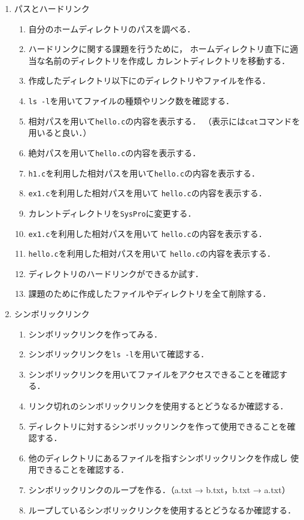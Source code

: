 \begin{enumerate}
\item パスとハードリンク
\begin{enumerate}
\item 自分のホームディレクトリのパスを調べる．
\item ハードリンクに関する課題を行うために，
ホームディレクトリ直下に適当な名前のディレクトリを作成し
カレントディレクトリを移動する．
\item 作成したディレクトリ以下にのディレクトリやファイルを作る．
\item \texttt{ls -l}を用いてファイルの種類やリンク数を確認する．
\item 相対パスを用いて\texttt{hello.c}の内容を表示する．
（表示には\texttt{cat}コマンドを用いると良い．）
\item 絶対パスを用いて\texttt{hello.c}の内容を表示する．
\item \texttt{h1.c}を利用した相対パスを用いて\texttt{hello.c}の内容を表示する．
\item \texttt{ex1.c}を利用した相対パスを用いて
\texttt{hello.c}の内容を表示する．
\item カレントディレクトリを\texttt{SysPro}に変更する．
\item \texttt{ex1.c}を利用した相対パスを用いて
\texttt{hello.c}の内容を表示する．
\item \texttt{hello.c}を利用した相対パスを用いて
\texttt{hello.c}の内容を表示する．
\item ディレクトリのハードリンクができるか試す．
\item 課題のために作成したファイルやディレクトリを全て削除する．
\end{enumerate}

\item シンボリックリンク
\begin{enumerate}
\item シンボリックリンクを作ってみる．
\item シンボリックリンクを\texttt{ls -l}を用いて確認する．
\item シンボリックリンクを用いてファイルをアクセスできることを確認する．
\item リンク切れのシンボリックリンクを使用するとどうなるか確認する．
\item ディレクトリに対するシンボリックリンクを作って使用できることを確認する．
\item 他のディレクトリにあるファイルを指すシンボリックリンクを作成し
      使用できることを確認する．
\item シンボリックリンクのループを作る．（a.txt →  b.txt，b.txt →  a.txt）
\item ループしているシンボリックリンクを使用するとどうなるか確認する．
（\|%
\end{enumerate}


\end{enumerate}
